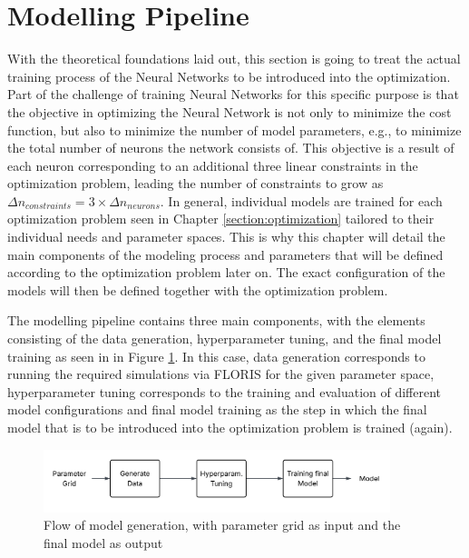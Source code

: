 \section{Modelling Pipeline} \label{sec:model_pipe}

With the theoretical foundations laid out, this section is going to treat the actual training process of the Neural Networks to be introduced into the optimization. Part of the challenge of training Neural Networks for this specific purpose is that the objective in optimizing the Neural Network is not only to minimize the cost function, but also to minimize the  number of model parameters, e.g., to minimize the total number of neurons the network consists of. This objective is a result of each neuron corresponding to an additional three linear constraints in the optimization problem, leading the number of constraints to grow as $\Delta n_{constraints} =3 \times \Delta n_{neurons}$. In general, individual models are trained for each optimization problem seen in Chapter \ref{section:optimization} tailored to their individual needs and parameter spaces. This is why this chapter will detail the main components of the modeling process and parameters that will be defined according to the optimization problem later on. The exact configuration of the models will then be defined together with the optimization problem.  

The modelling pipeline contains three main components, with the elements consisting of the data generation, hyperparameter tuning, and the final model training as seen in in Figure \ref{fig:model_flow}. In this case, data generation corresponds to running the required simulations via FLORIS  for the given parameter space, hyperparameter tuning corresponds to the training and evaluation of different model configurations and final model training as the step in which the final model that is to be introduced into the optimization problem is trained (again).


\begin{figure}[h] 
	\centering
	\includegraphics[width=0.9\textwidth]{../figures/modelling/model_flow.png} 
	\caption{Flow of model generation, with parameter grid as input and the final model as output}
	\label{fig:model_flow}
\end{figure}

